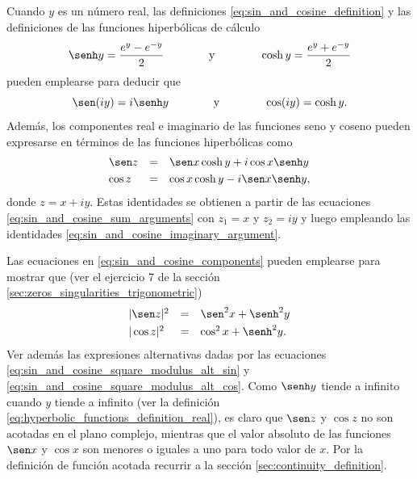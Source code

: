 \documentclass[a4paper]{report}
\begin{document}
Cuando \(y\) es un número real, las definiciones \ref{eq:sin_and_cosine_definition} y las definiciones de las funciones hiperbólicas de cálculo
\begin{equation}\label{eq:hyperbolic_functions_definition_real}
 \senh y=\frac{e^y-e^{-y}}{2}
 \qquad\qquad\textrm{y}\qquad\qquad
 \cosh y=\frac{e^y+e^{-y}}{2} 
\end{equation}
pueden emplearse para deducir que 
\begin{equation}\label{eq:sin_and_cosine_imaginary_argument}
 \sen(iy)=i\senh y
 \qquad\qquad\textrm{y}\qquad\qquad
 \cos(iy)=\cosh y. 
\end{equation}
Además, los componentes real e imaginario de las funciones seno y coseno pueden expresarse en términos de las funciones hiperbólicas como
\begin{equation}\label{eq:sin_and_cosine_components}
 \begin{array}{lll}
  \sen z&=&\sen x\cosh y+i\cos x\senh y\\[\smallskipamount]
  \cos z&=&\cos x\cosh y-i\sen x\senh y,
 \end{array} 
\end{equation}
donde \(z=x+iy\). Estas identidades se obtienen a partir de las ecuaciones \ref{eq:sin_and_cosine_sum_arguments} con \(z_1=x\) y \(z_2=iy\) y luego empleando las identidades \ref{eq:sin_and_cosine_imaginary_argument}.

Las ecuaciones en \ref{eq:sin_and_cosine_components} pueden emplearse para mostrar que (ver el ejercicio 7 de la sección \ref{sec:zeros_singularities_trigonometric})
\begin{equation}\label{eq:sin_and_cosine_square_modulus}
 \begin{array}{lll}
  |\sen z|^2&=&\sen^2x+\senh^2y\\[\smallskipamount]
  |\cos z|^2&=&\cos^2x+\senh^2y.
 \end{array} 
\end{equation}
Ver además las expresiones alternativas dadas por las ecuaciones \ref{eq:sin_and_cosine_square_modulus_alt_sin} y \ref{eq:sin_and_cosine_square_modulus_alt_cos}.
Como \(\senh y\) tiende a infinito cuando \(y\) tiende a infinito (ver la definición \ref{eq:hyperbolic_functions_definition_real}), es claro que \(\sen z\) y \(\cos z\) no son acotadas en el plano complejo, mientras que el valor absoluto de las funciones \(\sen x\) y \(\cos x\) son menores o iguales a uno para todo valor de \(x\). Por la definición de función acotada recurrir a la sección \ref{sec:continuity_definition}.
\end{document}
